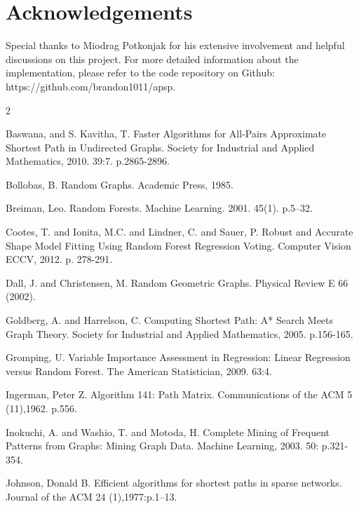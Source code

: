 \documentclass[10.5pt,journal]{IEEEtran}
\begin{document}
\section{Acknowledgements}
	Special thanks to Miodrag Potkonjak for his extensive involvement and helpful discussions
	on this project. For more detailed information about the implementation, please
	refer to the code repository on Github: https://github.com/brandon1011/apsp. 
	\begin{thebibliography} {2} \normalsize
	
		  Baswana, and S. Kavitha, T.
         Faster Algorithms for All-Pairs Approximate Shortest Path in Undirected Graphs.
         Society for Industrial and Applied Mathematics, 2010.
         39:7. p.2865-2896.
         
         Bollobas, B. 
         Random Graphs.
         Academic Press, 1985.
         
         Breiman, Leo. Random Forests. Machine Learning. 2001. 45(1). p.5–32.
         
         Cootes, T. and Ionita, M.C. and Lindner, C. and Sauer, P.
         Robust and Accurate Shape Model Fitting Using Random Forest Regression Voting.
         Computer Vision ECCV, 2012. p. 278-291.
         
		 Dall, J. and Christensen, M.
		Random Geometric Graphs.
		Physical Review E 66 (2002).
	
		 Goldberg, A. and Harrelson, C.
		Computing Shortest Path: A* Search Meets Graph Theory.
		Society for Industrial and Applied Mathematics, 2005.
		p.156-165.
		
		Gromping, U.
		Variable Importance Assessment in Regression: Linear Regression versus Random Forest.
		The American Statistician, 2009. 63:4.

		Ingerman, Peter Z.
		Algorithm 141: Path Matrix. 
		Communications of the ACM 5 (11),1962.
		p.556.
		
		Inokuchi, A. and Washio, T. and Motoda, H.
		Complete Mining of Frequent Patterns from Graphs: Mining Graph Data.
		Machine Learning, 2003. 50: p.321-354.
				
		Johnson, Donald B.
		Efficient algorithms for shortest paths in sparse networks.
		Journal of the ACM 24 (1),1977:p.1–13.
		

\end{thebibliography}
\end{document}
